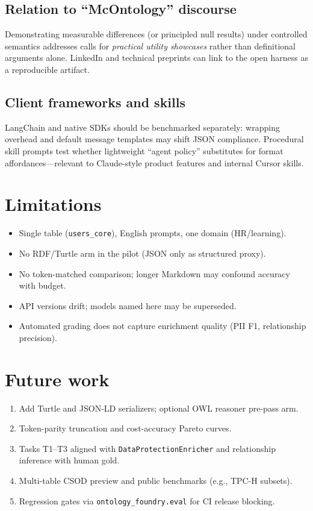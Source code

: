 \documentclass[11pt,a4paper]{article}
\begin{document}
\subsection{Relation to ``McOntology'' discourse}
Demonstrating measurable differences (or principled null results) under controlled semantics addresses calls for \emph{practical utility showcases} rather than definitional arguments alone.
LinkedIn and technical preprints can link to the open harness as a reproducible artifact.

\subsection{Client frameworks and skills}
LangChain and native SDKs should be benchmarked separately: wrapping overhead and default message templates may shift JSON compliance.
Procedural skill prompts test whether lightweight ``agent policy'' substitutes for format affordances---relevant to Claude-style product features and internal Cursor skills.

\section{Limitations}
\label{sec:limits}
\begin{itemize}[leftmargin=*]
  \item Single table (\texttt{users\_core}), English prompts, one domain (HR/learning).
  \item No RDF/Turtle arm in the pilot (JSON only as structured proxy).
  \item No token-matched comparison; longer Markdown may confound accuracy with budget.
  \item API versions drift; models named here may be superseded.
  \item Automated grading does not capture enrichment quality (PII F1, relationship precision).
\end{itemize}

\section{Future work}
\label{sec:future}
\begin{enumerate}[leftmargin=*]
  \item Add Turtle and JSON-LD serializers; optional OWL reasoner pre-pass arm.
  \item Token-parity truncation and cost-accuracy Pareto curves.
  \item Tasks T1--T3 aligned with \texttt{DataProtectionEnricher} and relationship inference with human gold.
  \item Multi-table CSOD preview and public benchmarks (e.g., TPC-H subsets).
  \item Regression gates via \texttt{ontology\_foundry.eval} for CI release blocking.
\end{enumerate}
\end{document}
